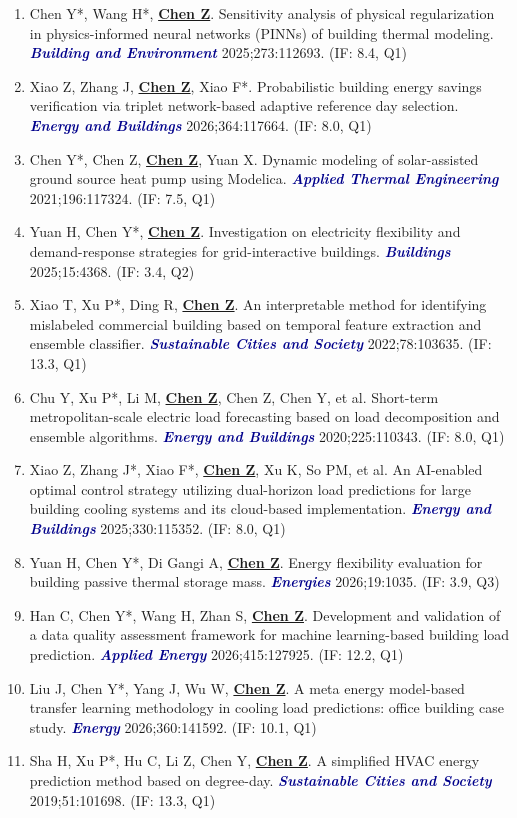 \documentclass[11pt,a4paper]{article}
\newcommand{\me}[1]{\underline{\textbf{#1}}}
\newcommand{\journal}[1]{\textcolor{darkblue}{\textbf{\textit{#1}}}}
\begin{document}
\begin{enumerate}
\item Chen Y*, Wang H*, \me{Chen Z}. Sensitivity analysis of physical regularization in physics-informed neural networks (PINNs) of building thermal modeling. \journal{Building and Environment} 2025;273:112693. (IF: 8.4, Q1)
\item Xiao Z, Zhang J, \me{Chen Z}, Xiao F*. Probabilistic building energy savings verification via triplet network-based adaptive reference day selection. \journal{Energy and Buildings} 2026;364:117664. (IF: 8.0, Q1)
\item Chen Y*, Chen Z, \me{Chen Z}, Yuan X. Dynamic modeling of solar-assisted ground source heat pump using Modelica. \journal{Applied Thermal Engineering} 2021;196:117324. (IF: 7.5, Q1)
\item Yuan H, Chen Y*, \me{Chen Z}. Investigation on electricity flexibility and demand-response strategies for grid-interactive buildings. \journal{Buildings} 2025;15:4368. (IF: 3.4, Q2)
\item Xiao T, Xu P*, Ding R, \me{Chen Z}. An interpretable method for identifying mislabeled commercial building based on temporal feature extraction and ensemble classifier. \journal{Sustainable Cities and Society} 2022;78:103635. (IF: 13.3, Q1)
\item Chu Y, Xu P*, Li M, \me{Chen Z}, Chen Z, Chen Y, et al. Short-term metropolitan-scale electric load forecasting based on load decomposition and ensemble algorithms. \journal{Energy and Buildings} 2020;225:110343. (IF: 8.0, Q1)
\item Xiao Z, Zhang J*, Xiao F*, \me{Chen Z}, Xu K, So PM, et al. An AI-enabled optimal control strategy utilizing dual-horizon load predictions for large building cooling systems and its cloud-based implementation. \journal{Energy and Buildings} 2025;330:115352. (IF: 8.0, Q1)
\item Yuan H, Chen Y*, Di Gangi A, \me{Chen Z}. Energy flexibility evaluation for building passive thermal storage mass. \journal{Energies} 2026;19:1035. (IF: 3.9, Q3)
\item Han C, Chen Y*, Wang H, Zhan S, \me{Chen Z}. Development and validation of a data quality assessment framework for machine learning-based building load prediction. \journal{Applied Energy} 2026;415:127925. (IF: 12.2, Q1)
\item Liu J, Chen Y*, Yang J, Wu W, \me{Chen Z}. A meta energy model-based transfer learning methodology in cooling load predictions: office building case study. \journal{Energy} 2026;360:141592. (IF: 10.1, Q1)
\item Sha H, Xu P*, Hu C, Li Z, Chen Y, \me{Chen Z}. A simplified HVAC energy prediction method based on degree-day. \journal{Sustainable Cities and Society} 2019;51:101698. (IF: 13.3, Q1)

\end{enumerate}
\end{document}
